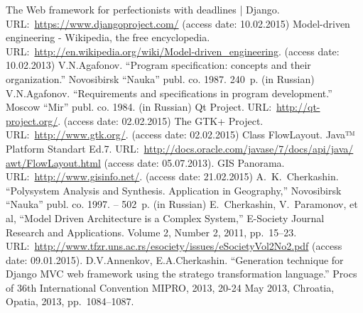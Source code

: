 \documentclass[conference]{IEEEtran}
\begin{document}
%
%
%
\vspace{1.4em} %
\begin{thebibliography}{11}
 The Web framework for perfectionists with deadlines | Django.   URL:~\url{https://www.djangoproject.com/} (access date: 10.02.2015)
Model-driven engineering - Wikipedia, the free encyclopedia. URL:~\url{http://en.wikipedia.org/wiki/Model-driven_engineering}. (access date: 10.02.2013)
 V.N.Agafonov. ``Program specification: concepts and their organization.'' Novosibirsk ``Nauka'' publ. co. 1987. 240~p. (in Russian)
 V.N.Agafonov. ``Requirements and specifications in program development.'' Moscow ``Mir'' publ. co. 1984. (in Russian)
 Qt Project. URL:~\url{http://qt-project.org/}. (access date: 02.02.2015)
 The GTK+ Project. URL:~\url{http://www.gtk.org/}. (access date: 02.02.2015)
Class FlowLayout. Java™ Platform Standart Ed.7. URL:~\url{http:/​/​docs.oracle.com/​javase/​7/​docs/​api/​java/​awt/​FlowLayout.html} (access date: 05.07.2013).
GIS Panorama. URL:~\url{http://www.gisinfo.net/}. (access date: 21.02.2015)
 A.~K.~Cherkashin. ``Polysystem Analysis and
  Synthesis. Application in Geography,'' Novosibirsk ``Nauka'' publ. co.
  1997. -- 502~p. (in Russian)
 E.~Cherkashin, V.~Paramonov, et al, ``Model Driven
  Architecture is a Complex System,'' E-Society Journal Research and
  Applications. Volume 2, Number 2, 2011, pp.~15--23.
  URL:~\url{http://www.tfzr.uns.ac.rs/esociety/issues/eSocietyVol2No2.pdf} (access date: 09.01.2015).
 D.V.Annenkov, E.A.Cherkashin. ``Generation technique for Django MVC web framework using the stratego transformation language.'' Procs of 36th International Convention MIPRO, 2013, 20-24 May 2013, Chroatia, Opatia, 2013, pp.~1084--1087.

\end{thebibliography}
\vspace{-2em}\mbox{} %
\end{document}
